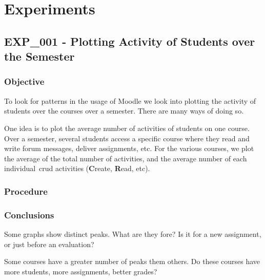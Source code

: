 \chapter{Experiments}

\section{EXP\_001 - Plotting Activity of Students over the Semester}

\subsection{Objective}

To look for patterns in the usage of Moodle we look into plotting the activity
of students over the courses over a semester. There are many ways of doing so.

One idea is to plot the average number of activities of students on one course.
Over a semester, several students access a specific course where they read and
write forum messages, deliver assignments, etc. For the various courses, we
plot the average of the total number of activities, and the average number of
each individual~\gls{crud} activities (\textbf{C}reate, \textbf{R}ead, etc).

\subsection{Procedure}

\subsection{Conclusions}

Some graphs show distinct peaks. What are they fore? Is it for a new
assignment, or just before an evaluation?

Some courses have a greater number of peaks them others. Do these courses have
more students, more assignments, better grades?
